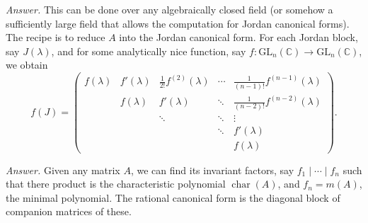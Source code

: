 \documentclass{mathproblems}
\newcommand\C{\mathbb{C}}
\newcommand\GL{\mathrm{GL}}
\begin{document}
\begin{questions}

\textit{Answer.} This can be done over any algebraically closed field (or somehow a sufficiently large field that allows the computation for Jordan canonical forms). The recipe is to reduce $A$ into the Jordan canonical form. For each Jordan block, say $J(\lambda)$, and for some analytically nice function, say $f:\GL_n(\C)\to \GL_n(\C)$, we obtain
$$
f(J)=\begin{pmatrix}
f(\lambda) & f'(\lambda) & \frac{1}{2!}f^{(2)}(\lambda) & \cdots & \frac{1}{(n-1)!}f^{(n-1)}(\lambda)\\
& f(\lambda) & f'(\lambda) & \ddots & \frac{1}{(n-2)!}f^{(n-2)}(\lambda)\\
& & \ddots & \ddots & \vdots \\
& & & \ddots & f'(\lambda) \\
& & & & f(\lambda)
\end{pmatrix}.
$$


\textit{Answer.} Given any matrix $A$, we can find its invariant factors, say $f_1\mid \cdots \mid f_n$ such that there product is the characteristic polynomial $\operatorname{char}(A)$, and $f_n=m(A)$, the minimal polynomial. The rational canonical form is the diagonal block of companion matrices of these.




\end{questions}
\end{document}
